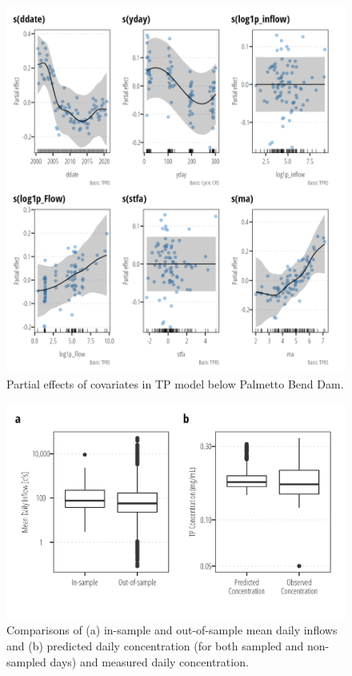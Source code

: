 \documentclass[
]{article}
\begin{document}
\begin{figure}[h]

{\centering \includegraphics{model_assessment_files/figure-pdf/unnamed-chunk-71-1.png}

}

\caption{Partial effects of covariates in TP model below Palmetto Bend
Dam.}

\end{figure}

\begin{figure}[h]

{\centering \includegraphics{model_assessment_files/figure-pdf/unnamed-chunk-72-1.png}

}

\caption{Comparisons of (a) in-sample and out-of-sample mean daily
inflows and (b) predicted daily concentration (for both sampled and
non-sampled days) and measured daily concentration.}

\end{figure}
\end{document}
